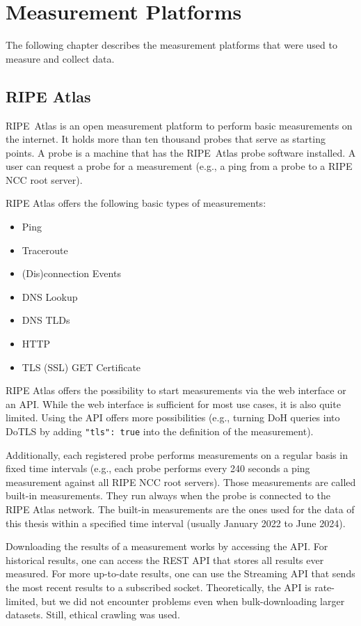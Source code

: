 \section{Measurement Platforms} \label{sec:measurement-platforms}

The following chapter describes the measurement platforms that were used to
measure and collect data.

\subsection{RIPE Atlas} \label{sec:ripe-atlas}

RIPE~Atlas is an open measurement platform to perform basic measurements on the
internet. It holds more than ten thousand probes that serve as starting points.
A probe is a machine that has the RIPE~Atlas probe software installed. A user
can request a probe for a measurement (e.g., a ping from a probe to a RIPE NCC
root server).

RIPE Atlas offers the following basic types of measurements:

\begin{itemize}
	\item Ping
	\item Traceroute
	\item (Dis)connection Events
	\item DNS Lookup
	\item DNS TLDs
	\item HTTP
	\item TLS (SSL) GET Certificate
\end{itemize}

RIPE Atlas offers the possibility to start measurements via the web interface
or an API. While the web interface is sufficient for most use cases, it is also
quite limited. Using the API offers more possibilities (e.g., turning DoH
queries into DoTLS by adding \verb|"tls": true| into the definition of the
measurement).

Additionally, each registered probe performs measurements on a regular basis in
fixed time intervals (e.g., each probe performs every 240 seconds a ping
measurement against all RIPE NCC root servers). Those measurements are called
built-in measurements. They run always when the probe is connected to the RIPE
Atlas network. The built-in measurements are the ones used for the data of this
thesis within a specified time interval (usually January 2022 to June 2024).

Downloading the results of a measurement works by accessing the API. For
historical results, one can access the REST API that stores all results ever
measured. For more up-to-date results, one can use the Streaming API that sends
the most recent results to a subscribed socket. Theoretically, the API is
rate-limited, but we did not encounter problems even when bulk-downloading
larger datasets. Still, ethical crawling was used.

